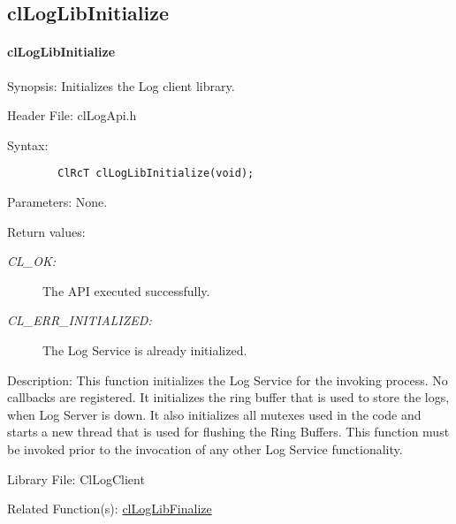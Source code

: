 \subsection{clLogLibInitialize}
\hypertarget{pagelog101}{}\paragraph{cl\-Log\-Lib\-Initialize}\label{pagelog101}
\begin{Desc}
\item[Synopsis:]Initializes the Log client library.\end{Desc}
\begin{Desc}
\item[Header File:]clLogApi.h\end{Desc}
\begin{Desc}
\item[Syntax:]

\footnotesize\begin{verbatim}        ClRcT clLogLibInitialize(void);
\end{verbatim}
\normalsize
\end{Desc}
\begin{Desc}
\item[Parameters:]None.\end{Desc}
\begin{Desc}
\item[Return values:]
\begin{description}
\item[{\em CL\_\-OK:}]The API executed successfully. \item[{\em CL\_\-ERR\_\-INITIALIZED:}]The Log Service is already initialized.\end{description}
\end{Desc}
\begin{Desc}
\item[Description:]This function initializes the Log Service for the invoking process. No callbacks are registered. It initializes the ring buffer that is used to store the logs, when Log Server is down. It also initializes all mutexes used in the code and starts a new thread that is used for flushing the Ring Buffers. This function must be invoked prior to the invocation of any other Log Service functionality.\end{Desc}
\begin{Desc}
\item[Library File:]Cl\-Log\-Client\end{Desc}
\begin{Desc}
\item[Related Function(s):]\hyperlink{group__group26}{cl\-Log\-Lib\-Finalize} \end{Desc}
\newpage

